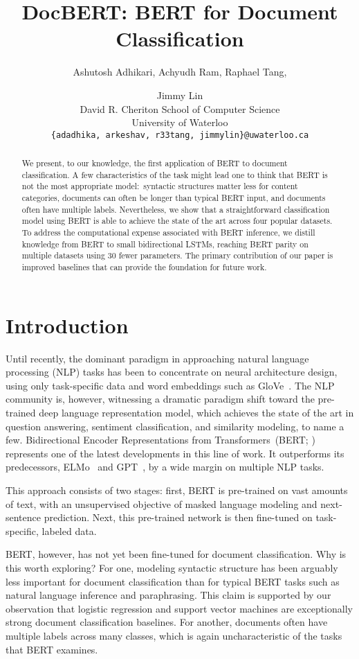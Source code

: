 \documentclass[11pt,a4paper]{article}
\title{DocBERT: BERT for Document Classification}
\author{Ashutosh Adhikari, Achyudh Ram, Raphael Tang, \and Jimmy Lin\vspace{0.1cm}\\
David R. Cheriton School of Computer Science\\
University of Waterloo\\
{\tt \{adadhika, arkeshav, r33tang, jimmylin\}@uwaterloo.ca}}
\date{}
\newcommand{\BERTL}[1]{BERT}
\newcommand{\BERTB}[1]{BERT}
\begin{document}
\maketitle
\begin{abstract}
We present, to our knowledge, the first application of BERT to document classification.
A few characteristics of the task might lead one to think that BERT is not the most appropriate model:\ syntactic structures matter less for content categories, documents can often be longer than typical BERT input, and documents often have multiple labels.
Nevertheless, we show that a straightforward classification model using BERT is able to achieve the state of the art across four popular datasets.
To address the computational expense associated with BERT inference, we distill knowledge from \BERTL{} to small bidirectional LSTMs, reaching \BERTB{} parity on multiple datasets using 30 fewer parameters.
The primary contribution of our paper is improved baselines that can provide the foundation for future work.
\end{abstract}

\section{Introduction}
Until recently, the dominant paradigm in approaching natural language processing (NLP) tasks has been to concentrate on neural architecture design, using only task-specific data and word embeddings such as GloVe~\cite{pennington2014glove}.
The NLP community is, however, witnessing a dramatic paradigm shift toward the pre-trained deep language representation model, which achieves the state of the art in question answering, sentiment classification, and similarity modeling, to name a few.
Bidirectional Encoder Representations from Transformers~(BERT; \citealp{devlin2018bert}) represents one of the latest developments in this line of work.
It outperforms its predecessors, ELMo~\cite{elmo} and GPT~\cite{radfordimproving}, by a wide margin on multiple NLP tasks.

This approach consists of two stages: first, BERT is pre-trained on vast amounts of text, with an unsupervised objective of masked language modeling and next-sentence prediction.
Next, this pre-trained network is then fine-tuned on task-specific, labeled data.

BERT, however, has not yet been fine-tuned for document classification.
Why is this worth exploring?
For one, modeling syntactic structure has been arguably less important for document classification than for typical BERT tasks such as natural language inference and paraphrasing.
This claim is supported by our observation that logistic regression and support vector machines are exceptionally strong document classification baselines.
For another, documents often have multiple labels across many classes, which is again uncharacteristic of the tasks that BERT examines.
\end{document}
